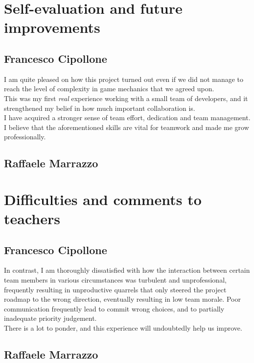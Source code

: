 \documentclass[12pt, a4paper]{report}
\theoremstyle{definition}
\begin{document}
\section{Self-evaluation and future improvements}

    \subsection*{Francesco Cipollone}

    I am quite pleased on how this project turned out even if we did not manage to reach the level of complexity in game mechanics that we agreed upon.\\
    This was my first \textit{real} experience working with a small team of developers, and it strengthened my belief in how much important collaboration is.\\
    I have acquired a stronger sense of team effort, dedication and team management. I believe that the aforementioned skills are vital for teamwork and made
    me grow professionally.

    \subsection*{Raffaele Marrazzo}


\section{Difficulties and comments to teachers}

    \subsection*{Francesco Cipollone}

    In contrast, I am thoroughly dissatisfied with how the interaction between certain team members in various circumstances was turbulent and unprofessional,
    frequently resulting in unproductive quarrels that only steered the project roadmap to the wrong direction, eventually resulting in low team morale.
    Poor communication frequently lead to commit wrong choices, and to partially inadequate priority judgement.\\
    There is a lot to ponder, and this experience will undoubtedly help us improve.

    \subsection*{Raffaele Marrazzo}
\end{document}
